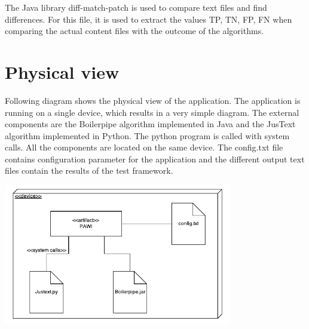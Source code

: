 The Java library diff-match-patch \cite{diffMatchPatch} is used to compare text files and find differences. For this file, it is used to extract the values TP, TN, FP, FN when comparing the actual content files with the outcome of the algorithms.


\section{Physical view}

Following diagram shows the physical view of the application. The application is running on a single device, which results in a very simple diagram. The external components are the Boilerpipe algorithm implemented in Java and the JusText algorithm implemented in Python. The python program is called with system calls. All the components are located on the same device. 
The config.txt file contains configuration parameter for the application and the different output text files contain the results of the test framework.

\includegraphics[width=10cm]{Figures/deploymentDiagram.pdf}


